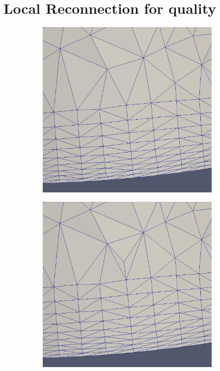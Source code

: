 \section{Local Reconnection for quality}

\begin{figure}
\centering
\begin{subfigure}{.5\textwidth}
  \centering
  \includegraphics[width=.8\linewidth]{img/m1/point-insertion-swapping/initial.eps}
  \caption{}
  \label{point-insert1}
\end{subfigure}%
\begin{subfigure}{.5\textwidth}
  \centering
  \includegraphics[width=.8\linewidth]{img/m1/point-insertion-swapping/point-inserted.eps}

\end{subfigure}
\end{figure}
